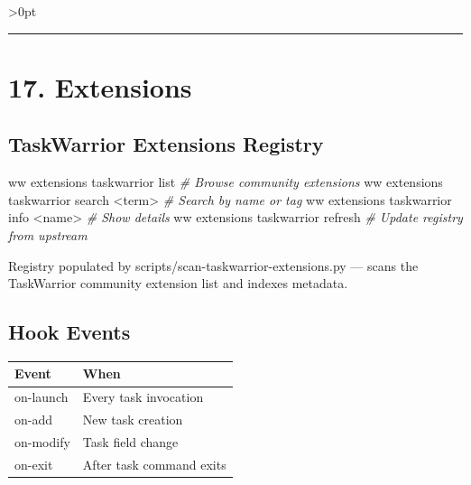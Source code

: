 \documentclass[11pt, a4paper, DIV=14]{scrartcl}
\renewcommand{\texttt}[1]{{\ttfamily\fontsize{8.5}{10.5}\selectfont\color{BabbNavy}#1}}
\newenvironment{Shaded}{%
  \vspace{4pt}%
  \begin{lrbox}{\ShadedBox}%
  \begin{minipage}{\dimexpr\linewidth-2\fboxsep\relax}%
  \vspace{4pt}%
}{%
  \vspace{4pt}%
  \end{minipage}%
  \end{lrbox}%
  \noindent\colorbox{CodeBg}{\usebox{\ShadedBox}}%
  \par\vspace{4pt}%
}
\newcommand{\CommentTok}[1]{\textcolor{BabbGray}{\textit{#1}}}
\newcommand{\ExtensionTok}[1]{#1}
\newcommand{\NormalTok}[1]{#1}
\newcommand{\OperatorTok}[1]{#1}
\newenvironment{Highlighting}{\ttfamily\fontsize{8.2}{11}\selectfont}{}
\newcounter{none}
\let\origRule\rule
\renewcommand{\rule}[3][0pt]{%
  \ifnum\dimexpr#3\relax>0pt
    \par\vspace{2pt}\noindent{\color{BabbBorder}\origRule[#1]{#2}{#3}}\par\vspace{2pt}%
  \else
    \origRule[#1]{#2}{#3}%
  \fi
}
\begin{document}
\begin{center}\rule{0.5\linewidth}{0.5pt}\end{center}

\section{17. Extensions}\label{extensions}

\subsection{TaskWarrior Extensions
Registry}\label{taskwarrior-extensions-registry}

\begin{Shaded}
\begin{Highlighting}[]
\ExtensionTok{ww}\NormalTok{ extensions taskwarrior list              }\CommentTok{\# Browse community extensions}
\ExtensionTok{ww}\NormalTok{ extensions taskwarrior search }\OperatorTok{\textless{}}\NormalTok{term}\OperatorTok{\textgreater{}}     \CommentTok{\# Search by name or tag}
\ExtensionTok{ww}\NormalTok{ extensions taskwarrior info }\OperatorTok{\textless{}}\NormalTok{name}\OperatorTok{\textgreater{}}       \CommentTok{\# Show details}
\ExtensionTok{ww}\NormalTok{ extensions taskwarrior refresh           }\CommentTok{\# Update registry from upstream}
\end{Highlighting}
\end{Shaded}

Registry populated by \texttt{scripts/scan-taskwarrior-extensions.py}
--- scans the TaskWarrior community extension list and indexes metadata.

\subsection{Hook Events}\label{hook-events}

{\def\LTcaptype{none} %
\begin{longtable}[]{@{}ll@{}}
\toprule\noalign{}
Event & When \\
\midrule\noalign{}
\endhead
\bottomrule\noalign{}
\endlastfoot
\texttt{on-launch} & Every \texttt{task} invocation \\
\texttt{on-add} & New task creation \\
\texttt{on-modify} & Task field change \\
\texttt{on-exit} & After \texttt{task} command exits \\
\end{longtable}
}
\end{document}
